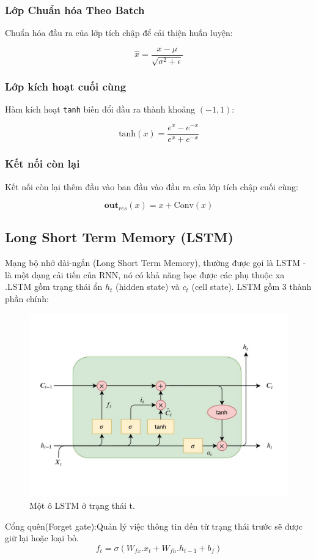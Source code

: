\documentclass[conference]{IEEEtran}
\begin{document}
\subsubsection{Lớp Chuẩn hóa Theo Batch}
Chuẩn hóa đầu ra của lớp tích chập để cải thiện huấn luyện:

\[
    \hat{x} = \frac{x - \mu}{\sqrt{\sigma^2 + \epsilon}}
\]

\subsubsection{Lớp kích hoạt cuối cùng}
Hàm kích hoạt \texttt{tanh} biến đổi đầu ra thành khoảng \((-1, 1)\):

\[
    \text{tanh}(x) = \frac{e^x - e^{-x}}{e^x + e^{-x}}
\]

\subsubsection{Kết nối còn lại}
Kết nối còn lại thêm đầu vào ban đầu vào đầu ra của lớp tích chập cuối cùng:

\[
    \textbf{out}_{res}(x) = x + \text{Conv}(x)
\]


\subsection{Long Short Term Memory (LSTM)}
Mạng bộ nhớ dài-ngắn (Long Short Term Memory), thường được gọi là LSTM - là một dạng cải tiến của RNN, nó có khả năng học được các phụ thuộc xa .LSTM gồm trạng thái ẩn \(h_t\) (hidden state) và \(c_t\) (cell state). LSTM gồm 3 thành phần chính:
\begin{figure}[H]
    \centering
    \begin{minipage}{0.45\textwidth}
        \centering
        \includegraphics[width=1\textwidth]{bibliography/figure/LSTM/lstm.pdf}
        \caption{Một ô LSTM ở trạng thái t.}
        \label{fig:LSTM}
    \end{minipage}

\end{figure}
Cổng quên(Forget gate):Quản lý việc thông tin đến từ trạng thái trước sẽ được giữ lại hoặc loại bỏ.
\[f_t=\sigma(W_{fx}.x_t+W_{fh}.h_{t-1}+b_f)\]
\end{document}
